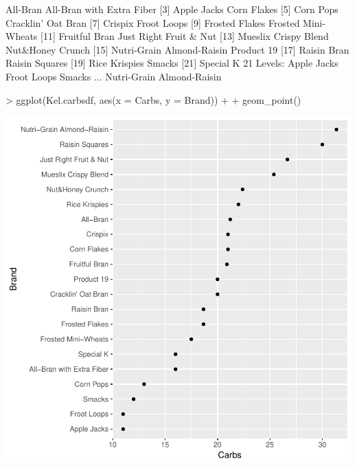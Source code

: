 \begin{Schunk}
\begin{Soutput}
 [1] All-Bran                  All-Bran with Extra Fiber
 [3] Apple Jacks               Corn Flakes              
 [5] Corn Pops                 Cracklin' Oat Bran       
 [7] Crispix                   Froot Loops              
 [9] Frosted Flakes            Frosted Mini-Wheats      
[11] Fruitful Bran             Just Right Fruit & Nut   
[13] Mueslix Crispy Blend      Nut&Honey Crunch         
[15] Nutri-Grain Almond-Raisin Product 19               
[17] Raisin Bran               Raisin Squares           
[19] Rice Krispies             Smacks                   
[21] Special K                
21 Levels: Apple Jacks Froot Loops Smacks ... Nutri-Grain Almond-Raisin
\end{Soutput}
\begin{Sinput}
> ggplot(Kel.carbsdf, aes(x = Carbs, y = Brand)) +
+   geom_point()
\end{Sinput}
\end{Schunk}
\includegraphics{lect_chapter5_v2-023}


